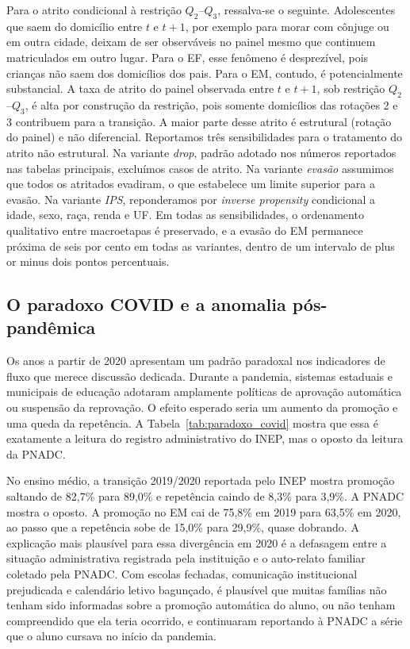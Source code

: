 Para o atrito condicional à restrição $Q_2$--$Q_3$, ressalva-se o
seguinte. Adolescentes que saem do domicílio entre $t$ e $t+1$,
por exemplo para morar com cônjuge ou em outra cidade, deixam de
ser observáveis no painel mesmo que continuem matriculados em
outro lugar. Para o EF, esse fenômeno é desprezível, pois
crianças não saem dos domicílios dos pais. Para o EM, contudo, é
potencialmente substancial. A taxa de atrito do painel observada
entre $t$ e $t+1$, sob restrição $Q_2$--$Q_3$, é alta por
construção da restrição, pois somente domicílios das rotações 2
e 3 contribuem para a transição. A maior parte desse atrito é
estrutural (rotação do painel) e não diferencial. Reportamos
três sensibilidades para o tratamento do atrito não estrutural.
Na variante \emph{drop}, padrão adotado nos números reportados
nas tabelas principais, excluímos casos de atrito. Na variante
\emph{evasão} assumimos que todos os atritados evadiram, o que
estabelece um limite superior para a evasão. Na variante
\emph{IPS}, reponderamos por \emph{inverse propensity}
condicional a idade, sexo, raça, renda e UF. Em todas as
sensibilidades, o ordenamento qualitativo entre macroetapas é
preservado, e a evasão do EM permanece próxima de seis por cento
em todas as variantes, dentro de um intervalo de plus or minus
dois pontos percentuais.

\subsection{O paradoxo COVID e a anomalia pós-pandêmica}
\label{ssec:paradoxo_covid}

Os anos a partir de 2020 apresentam um padrão paradoxal nos
indicadores de fluxo que merece discussão dedicada. Durante a
pandemia, sistemas estaduais e municipais de educação adotaram
amplamente políticas de aprovação automática ou suspensão da
reprovação. O efeito esperado seria um aumento da promoção e
uma queda da repetência. A Tabela~\ref{tab:paradoxo_covid}
mostra que essa é exatamente a leitura do registro
administrativo do INEP, mas o oposto da leitura da PNADC.



No ensino médio, a transição 2019/2020 reportada pelo INEP
mostra promoção saltando de 82,7\% para 89,0\% e repetência
caindo de 8,3\% para 3,9\%. A PNADC mostra o oposto. A
promoção no EM cai de 75,8\% em 2019 para 63,5\% em 2020, ao
passo que a repetência sobe de 15,0\% para 29,9\%, quase
dobrando. A explicação mais plausível para essa divergência
em 2020 é a defasagem entre a situação administrativa
registrada pela instituição e o auto-relato familiar coletado
pela PNADC. Com escolas fechadas, comunicação institucional
prejudicada e calendário letivo bagunçado, é plausível que
muitas famílias não tenham sido informadas sobre a promoção
automática do aluno, ou não tenham compreendido que ela teria
ocorrido, e continuaram reportando à PNADC a série que o
aluno cursava no início da pandemia.

